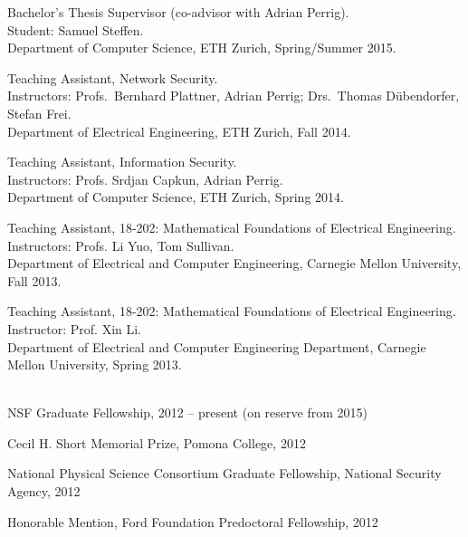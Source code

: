 \documentclass[11pt]{article}
\begin{document}
\noindent Bachelor's Thesis Supervisor (co-advisor with Adrian Perrig).\\
Student: Samuel Steffen.\\
Department of Computer Science, ETH Zurich, Spring/Summer 2015.
\vspace{2mm}

\noindent Teaching Assistant, Network Security.\\
Instructors: Profs.\ Bernhard Plattner, Adrian Perrig; Drs.\ Thomas
D\"{u}bendorfer, Stefan Frei.\\
Department of Electrical Engineering, ETH Zurich, Fall 2014.
\vspace{2mm}

\noindent Teaching Assistant, Information Security.\\
Instructors: Profs. Srdjan Capkun, Adrian Perrig.\\
Department of Computer Science, ETH Zurich, Spring 2014.
\vspace{2mm}

\noindent Teaching Assistant, 18-202: Mathematical Foundations of Electrical
Engineering.\\
Instructors: Profs. Li Yuo, Tom Sullivan.\\
Department of Electrical and Computer Engineering, Carnegie Mellon University,
Fall 2013.
\vspace{2mm}

\noindent Teaching Assistant, 18-202: Mathematical Foundations of Electrical
Engineering.\\
Instructor: Prof. Xin Li.\\
Department of Electrical and Computer Engineering Department, Carnegie Mellon
University, Spring 2013.\\
\vspace{2mm}

\\

\noindent NSF Graduate Fellowship,
2012 -- present (on reserve from 2015)
\vspace{2mm}

\noindent Cecil H. Short Memorial Prize,
Pomona College, 2012
\vspace{2mm}

\noindent National Physical Science Consortium Graduate Fellowship,
National Security Agency, 2012
\vspace{2mm}

\noindent Honorable Mention, Ford Foundation Predoctoral Fellowship,
2012
\vspace{2mm}
\end{document}
